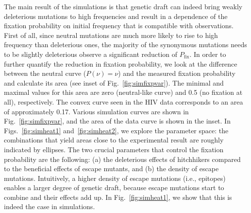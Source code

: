 \documentclass[rmp, twocolumn]{revtex4}
\newcommand{\FIG}[1]{Fig.~\ref{fig:#1}}
\newcommand{\FIGS}[2]{Figs.~\ref{fig:#1} and~\ref{fig:#2}}
\begin{document}
The main result of the simulations is that genetic draft can indeed bring weakly
deleterious mutations to high frequencies and result in a dependence of the
fixation probability on initial frequency that is compatible with observations.
First of all, since neutral mutations
are much more likely to rise to high frequency than deleterious ones, the
majority of the synonymous mutations needs to be slightly deleterious observe a
significant reduction of $P_\text{fix}$.
In order to further quantify the reduction in fixation probability, we look at the
difference between the neutral curve ($P(\nu) = \nu$) and the measured fixation
probability and calculate its area (see inset of \FIG{simfixpvar}). The minimal and maximal values for this
area are zero (neutral-like curve) and 0.5 (no fixation at all),
respectively. The convex curve seen in the HIV data corresponds to an area of
approximately 0.17. Various simulation curves are shown in \FIG{simfixpvar}, and
the area of the data curve is shown in the inset.
In \FIGS{simheat1}{simheat2}, we explore the parameter space: the combinations that yield areas close to the
experimental result are roughly indicated by ellipses. The two crucial parameters
that control the fixation probability are the following: (a) the deleterious
effects of hitchhikers compared to the beneficial effects of escape mutants, and
(b) the density of escape mutations. Intuitively, a higher density of escape
mutations (i.e., epitopes) enables a larger degree of genetic draft, because
escape mutations start to combine and their effects add up. In \FIG{simheat1},
we show that this is indeed the case in simulations.
\end{document}
